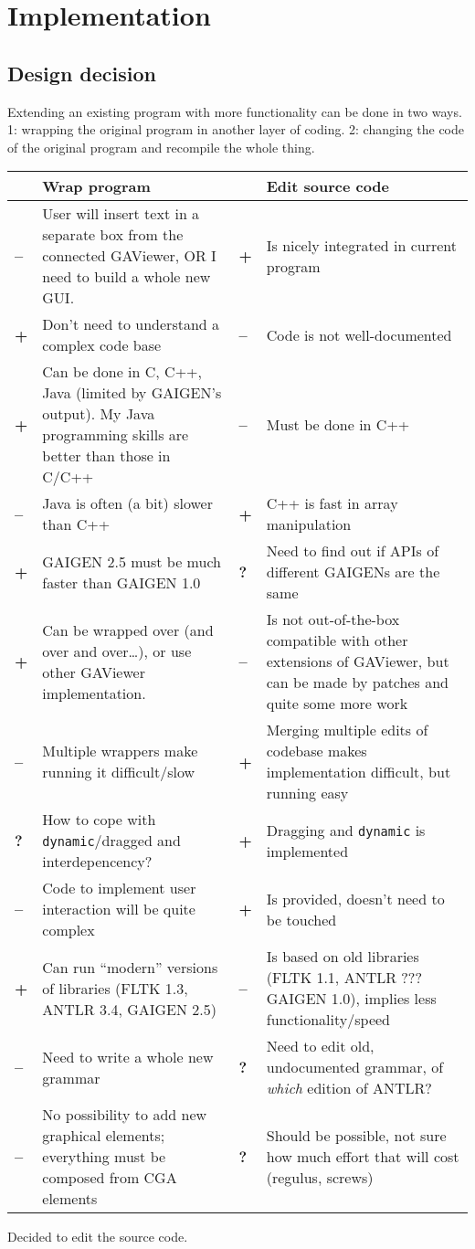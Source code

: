 \section{Implementation}
\label{ch:results}

\subsection{Design decision}

Extending an existing program with more functionality can be done in two ways. 1: wrapping the original program in another layer of coding. 2: changing the code of the original program and recompile the whole thing.

\newcommand{\pro}{\textbf{+} &}
\newcommand{\con}{\textbf{--} &}
\newcommand{\que}{\textbf{?} &}
\begin{tabular}{p{0.5cm}p{5.5cm}|p{0.5cm}p{5.5cm}}
  & Wrap program & & Edit source code \\
  \hline
  \con User will insert text in a separate box from the connected GAViewer, OR I need to build a whole new GUI. & \pro Is nicely integrated in current program \\
  \pro Don't need to understand a complex code base & \con Code is not well-documented \\
  \pro Can be done in C, C++, Java (limited by GAIGEN's output). My Java programming skills are better than those in C/C++ & \con Must be done in C++ \\
  \con Java is often (a bit) slower than C++ & \pro C++ is fast in array manipulation \\
  \pro GAIGEN 2.5 must be much faster than GAIGEN 1.0 & \que Need to find out if APIs of different GAIGENs are the same \\
  \pro Can be wrapped over (and over and over\ldots), or use other GAViewer implementation. & \con Is not out-of-the-box compatible with other extensions of GAViewer, but can be made by patches and quite some more work \\
  \con Multiple wrappers make running it difficult/slow & \pro Merging multiple edits of codebase makes implementation difficult, but running easy \\
  \que How to cope with \texttt{dynamic}/dragged and interdepencency? & \pro Dragging and \texttt{dynamic} is implemented \\
  \con Code to implement user interaction will be quite complex & \pro Is provided, doesn't need to be touched \\
  \pro Can run ``modern'' versions of libraries (FLTK 1.3, ANTLR 3.4, GAIGEN 2.5) & \con Is based on old libraries (FLTK 1.1, ANTLR ??? GAIGEN 1.0), implies less functionality/speed \\
  \con Need to write a whole new grammar & \que Need to edit old, undocumented grammar, of \emph{which} edition of ANTLR? \\
  \con No possibility to add new graphical elements; everything must be composed from CGA elements & \que Should be possible, not sure how much effort that will cost (regulus, screws)
\end{tabular}

Decided to edit the source code.
